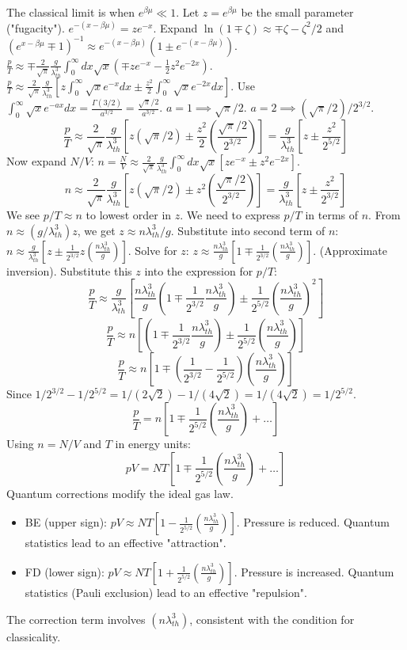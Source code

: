 \documentclass[11pt]{article}
\newcommand{\lambdaT}{\lambda_{th}} %
\begin{document}
The classical limit is when $e^{\beta\mu} \ll 1$. Let $z = e^{\beta\mu}$ be the small parameter ("fugacity"). $e^{-(x-\beta\mu)} = z e^{-x}$.
Expand $\ln(1 \mp \zeta) \approx \mp \zeta - \zeta^2/2$ and $(e^{x-\beta\mu} \mp 1)^{-1} \approx e^{-(x-\beta\mu)} (1 \pm e^{-(x-\beta\mu)})$.
$\frac{p}{T} \approx \mp \frac{2}{\sqrt{\pi}} \frac{g}{\lambdaT^3} \int_0^\infty dx \sqrt{x} (\mp z e^{-x} - \frac{1}{2} z^2 e^{-2x})$.
$\frac{p}{T} \approx \frac{2}{\sqrt{\pi}} \frac{g}{\lambdaT^3} [z \int_0^\infty \sqrt{x}e^{-x} dx \pm \frac{z^2}{2} \int_0^\infty \sqrt{x}e^{-2x} dx]$.
Use $\int_0^\infty \sqrt{x} e^{-ax} dx = \frac{\Gamma(3/2)}{a^{3/2}} = \frac{\sqrt{\pi}/2}{a^{3/2}}$.
$a=1 \implies \sqrt{\pi}/2$. $a=2 \implies (\sqrt{\pi}/2) / 2^{3/2}$.
\[ \frac{p}{T} \approx \frac{2}{\sqrt{\pi}} \frac{g}{\lambdaT^3} [z (\sqrt{\pi}/2) \pm \frac{z^2}{2} (\frac{\sqrt{\pi}/2}{2^{3/2}})] = \frac{g}{\lambdaT^3} [z \pm \frac{z^2}{2^{5/2}}] \]
Now expand $N/V$:
$n = \frac{N}{V} \approx \frac{2}{\sqrt{\pi}} \frac{g}{\lambdaT^3} \int_0^\infty dx \sqrt{x} [z e^{-x} \pm z^2 e^{-2x}]$.
\[ n \approx \frac{2}{\sqrt{\pi}} \frac{g}{\lambdaT^3} [z (\sqrt{\pi}/2) \pm z^2 (\frac{\sqrt{\pi}/2}{2^{3/2}})] = \frac{g}{\lambdaT^3} [z \pm \frac{z^2}{2^{3/2}}] \]
We see $p/T \approx n$ to lowest order in $z$. We need to express $p/T$ in terms of $n$.
From $n \approx (g/\lambdaT^3)z$, we get $z \approx n \lambdaT^3 / g$.
Substitute into second term of $n$: $n \approx \frac{g}{\lambdaT^3} [z \pm \frac{1}{2^{3/2}} z (\frac{n\lambdaT^3}{g})]$.
Solve for $z$: $z \approx \frac{n \lambdaT^3}{g} [1 \mp \frac{1}{2^{3/2}} (\frac{n \lambdaT^3}{g})]$. (Approximate inversion).
Substitute this $z$ into the expression for $p/T$:
\[ \frac{p}{T} \approx \frac{g}{\lambdaT^3} [ \frac{n\lambdaT^3}{g}(1 \mp \frac{1}{2^{3/2}}\frac{n\lambdaT^3}{g}) \pm \frac{1}{2^{5/2}} (\frac{n\lambdaT^3}{g})^2 ] \]
\[ \frac{p}{T} \approx n [ (1 \mp \frac{1}{2^{3/2}}\frac{n\lambdaT^3}{g}) \pm \frac{1}{2^{5/2}} (\frac{n\lambdaT^3}{g}) ] \]
\[ \frac{p}{T} \approx n [ 1 \mp (\frac{1}{2^{3/2}} - \frac{1}{2^{5/2}}) (\frac{n\lambdaT^3}{g}) ] \]
Since $1/2^{3/2} - 1/2^{5/2} = 1/(2\sqrt{2}) - 1/(4\sqrt{2}) = 1/(4\sqrt{2}) = 1/2^{5/2}$.
\[ \frac{p}{T} = n \left[ 1 \mp \frac{1}{2^{5/2}} \left(\frac{n\lambdaT^3}{g}\right) + \dots \right] \]
Using $n=N/V$ and $T$ in energy units:
\[ pV = NT \left[ 1 \mp \frac{1}{2^{5/2}} \left(\frac{n\lambdaT^3}{g}\right) + \dots \right] \]
Quantum corrections modify the ideal gas law.
\begin{itemize}
    \item BE (upper sign): $pV \approx NT [1 - \frac{1}{2^{5/2}} (\frac{n\lambdaT^3}{g})]$. Pressure is reduced. Quantum statistics lead to an effective "attraction".
    \item FD (lower sign): $pV \approx NT [1 + \frac{1}{2^{5/2}} (\frac{n\lambdaT^3}{g})]$. Pressure is increased. Quantum statistics (Pauli exclusion) lead to an effective "repulsion".
\end{itemize}
The correction term involves $(n\lambdaT^3)$, consistent with the condition for classicality.
\end{document}
